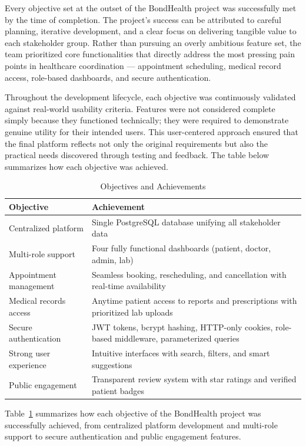 \noindent Every objective set at the outset of the BondHealth project was successfully met by the time of completion. The project's success can be attributed to careful planning, iterative development, and a clear focus on delivering tangible value to each stakeholder group. Rather than pursuing an overly ambitious feature set, the team prioritized core functionalities that directly address the most pressing pain points in healthcare coordination --- appointment scheduling, medical record access, role-based dashboards, and secure authentication.

\noindent Throughout the development lifecycle, each objective was continuously validated against real-world usability criteria. Features were not considered complete simply because they functioned technically; they were required to demonstrate genuine utility for their intended users. This user-centered approach ensured that the final platform reflects not only the original requirements but also the practical needs discovered through testing and feedback. The table below summarizes how each objective was achieved.

\begin{table}[H]
\centering
\caption{Objectives and Achievements}
\label{tab:achievements}
\begin{tabular}{|l|p{10cm}|}
\hline
\textbf{Objective} & \textbf{Achievement} \\
\hline
Centralized platform & Single PostgreSQL database unifying all stakeholder data \\
\hline
Multi-role support & Four fully functional dashboards (patient, doctor, admin, lab) \\
\hline
Appointment management & Seamless booking, rescheduling, and cancellation with real-time availability \\
\hline
Medical records access & Anytime patient access to reports and prescriptions with prioritized lab uploads \\
\hline
Secure authentication & JWT tokens, bcrypt hashing, HTTP-only cookies, role-based middleware, parameterized queries \\
\hline
Strong user experience & Intuitive interfaces with search, filters, and smart suggestions \\
\hline
Public engagement & Transparent review system with star ratings and verified patient badges \\
\hline
\end{tabular}
\end{table}
\noindent Table~\ref{tab:achievements} summarizes how each objective of the BondHealth project was successfully achieved, from centralized platform development and multi-role support to secure authentication and public engagement features.

